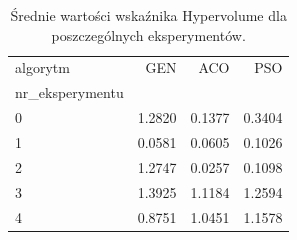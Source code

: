 \begin{table}
\caption{Średnie wartości wskaźnika Hypervolume dla poszczególnych eksperymentów.}
\label{tab:hv_srednie}
\begin{tabular}{lrrr}
\toprule
algorytm & GEN & ACO & PSO \\
nr_eksperymentu &  &  &  \\
\midrule
0 & 1.2820 & 0.1377 & 0.3404 \\
1 & 0.0581 & 0.0605 & 0.1026 \\
2 & 1.2747 & 0.0257 & 0.1098 \\
3 & 1.3925 & 1.1184 & 1.2594 \\
4 & 0.8751 & 1.0451 & 1.1578 \\
\bottomrule
\end{tabular}
\end{table}
